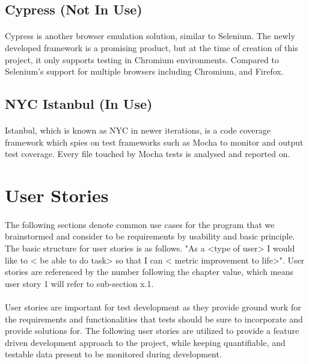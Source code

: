 \documentclass[12pt]{article}
\begin{document}
\subsection{Cypress (Not In Use)}
\paragraph{}	Cypress is another browser emulation solution, similar to Selenium. The newly developed framework is a promising product, but at the time of creation of this project, it only supports testing in Chromium environments. Compared to Selenium's support for multiple browsers including Chromium, and Firefox. 
\subsection{NYC Istanbul (In Use)}
\paragraph{}	Istanbul, which is known as NYC in newer iterations, is a code coverage framework which spies on test frameworks such as Mocha to monitor and output test coverage. Every file touched by Mocha tests is analysed and reported on. 
\newpage

\section{User Stories}
\paragraph{}	The following sections denote common use cases for the program that we brainstormed and consider to be requirements by usability and basic principle. The basic structure for user stories is as follows. "As a <type of user> I would like to < be able to do task> so that I can < metric improvement to life>". User stories are referenced by the number following the chapter value, which means user story 1 will refer to sub-section x.1.

\paragraph{}	User stories are important for test development as they provide ground work for the requirements and functionalities that tests should be sure to incorporate and provide solutions for. The following user stories are utilized to provide a feature driven development approach to the project, while keeping quantifiable, and testable data present to be monitored during development. 
\end{document}
